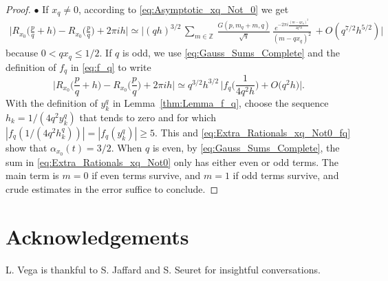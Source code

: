 \documentclass[11pt,reqno]{amsart}
\theoremstyle{definition}
\begin{document}
\begin{proof}
$\bullet$ If $x_q \neq 0$, according to \eqref{eq:Asymptotic_xq_Not_0} we get
\begin{equation}\label{eq:Extra_Rationals_xq_Not0}
\begin{split}
\Big| R_{x_0}\Big( \frac{p}{q} + h \Big) - R_{x_0}\Big( \frac{p}{q} \Big) + 2\pi i h \Big|
\simeq \Big| (qh)^{3/2} \,\sum_{m \in \mathbb Z} \, \frac{ G(p,m_q + m,q)}{\sqrt{q}} \,  
\frac{e^{- 2\pi i \frac{(m - qx_q)^2}{4 q^2 h}}}{ (m - qx_q)^2} \,  + O\left( q^{7/2} h^{5/2}  \right) \Big|
\end{split}
\end{equation}
because $0 < qx_q \leq 1/2$. 
If $q$ is odd, we use \eqref{eq:Gauss_Sums_Complete} and the definition of $f_q$ in \eqref{eq:f_q}
to write 
\begin{equation}\label{eq:Extra_Rationals_xq_Not0_fq}
 \Big|R_{x_0}\Big( \frac{p}{q} + h \Big) - R_{x_0}\Big( \frac{p}{q} \Big) + 2\pi i h \Big|  
\simeq q^{3/2} h^{3/2} \,\Big| f_q\Big( \frac{1}{4q^2h} \Big) + O\big( q^2h\big) \Big|. 
\end{equation}
With the definition of $y_k^q$ in Lemma~\ref{thm:Lemma_f_q},  choose the sequence $h_k = 1/(4q^2y_k^q)$ that tends to zero and for which $|f_q(1/(4q^2h_k^q))| = |f_q(y^q_k)| \geq 5$. This and \eqref{eq:Extra_Rationals_xq_Not0_fq} show that $\alpha_{x_0}(t) = 3/2$. 
When $q$ is even,
by \eqref{eq:Gauss_Sums_Complete},
the sum in \eqref{eq:Extra_Rationals_xq_Not0}  only has either even or odd terms.
The main term is $m=0$ if even terms survive, and $m=1$ if odd terms survive,
and crude estimates in the error suffice to conclude. 

\end{proof}











%

\section*{Acknowledgements}
L. Vega is thankful to S. Jaffard and S. Seuret for insightful conversations.
\end{document}
